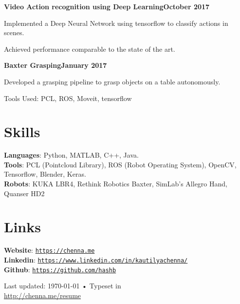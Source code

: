 \documentclass[letterpaper, margin, line]{resume}
\begin{document}
\begin{resume}
	\textbf{Video Action recognition using Deep Learning}\hfill \textbf{October 2017}
	\begin{list2}
	\item Implemented a Deep Neural Network using tensorflow to classify actions in scenes.
	\item Achieved performance comparable to the state of the art.
	\end{list2}\vspace{-1.5mm}

	\textbf{Baxter Grasping}\hfill \textbf{January 2017}
	\begin{list2}
		\item Developed a grasping pipeline to grasp objects on a table autonomously.
		\item Tools Used: PCL, ROS, Moveit, tensorflow
	\end{list2}\vspace{-1.5mm}
		


    \section{\mysidestyle Skills} 

    \textbf{Languages}: Python, MATLAB, C++, Java. \\[1mm]
    \textbf{Tools}: PCL (Pointcloud Library), ROS (Robot Operating System), OpenCV, Tensorflow, Blender, Keras. \\[1mm]
    \textbf{Robots}: KUKA LBR4, Rethink Robotics Baxter, SimLab's Allegro Hand, Quanser HD2
    
    
    \section{\mysidestyle Links}
	\textbf{Website}: \texttt{\href{https://chenna.me}{https://chenna.me}} \\[1mm]
    \textbf{Linkedin}: \texttt{\href{https://www.linkedin.com/in/kautilyachenna/}{https://www.linkedin.com/in/kautilyachenna/}}\\[1mm]
    \textbf{Github}: \texttt{\href{https://github.com/hashb}{https://github.com/hashb}}
    

\begin{center}
	{\scriptsize  Last updated: \today\- •\- Typeset in \href{}{
			\XeTeX }\\
		\href{http://chenna.me/resume}{http://chenna.me/resume}}
\end{center}

\end{resume}
\end{document}
